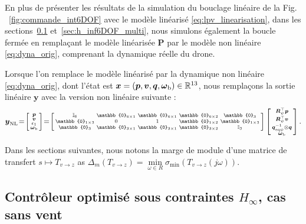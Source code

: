 En plus de présenter les résultats de la simulation du bouclage linéaire de la Fig. ~\ref{fig:commande_int6DOF} avec le modèle linéarisé \eqref{eq:lpv_linearisation}, dans les sections~\ref{sec:zerowind} et~\ref{sec:h_inf6DOF_multi}, nous simulons également la boucle fermée en remplaçant le modèle linéarisée $\boldsymbol{P}$ par le modèle non linéaire \eqref{eq:dyna_orig}, comprenant la dynamique réelle du drone.

Lorsque l'on remplace le modèle linéarisé par la dynamique non linéaire \eqref{eq:dyna_orig}, dont l'état est $\boldsymbol{x} = (\boldsymbol{p}, \boldsymbol{v}, \boldsymbol{q},\boldsymbol{\omega}_{\text{b}}) \in {\mathbb R}^{13} $, nous remplaçons la sortie linéaire $\boldsymbol{y}$ avec la version non linéaire suivante :
\begin{align}
\label{eq:output}
    \boldsymbol{y}_{\text{NL}} \!=\! \smallmat{\boldsymbol{p}\\
     \boldsymbol{v}\\
     \epsilon_{1}\\
     \boldsymbol{\omega}_{\text{b}}} \!=\! \left[ \begin{smallmatrix} \mathbb{I}_{6} & \mathbb{0}_{6\times 1} & \mathbb{0}_{6\times 1} & \mathbb{0}_{6\times 2} & \mathbb{0}_{3}\\
     \mathbb{0}_{1\times 3} & 0 & 1 & \mathbb{0}_{1\times 2} & \mathbb{0}_{1 \times 3} \\
         \mathbb{0}_{3} & \mathbb{0}_{3\times 1} & \mathbb{0}_{3\times 1} & \mathbb{0}_{3\times 2} &   \mathbb{I}_{3}
         \end{smallmatrix} \right]
         \smallmat{\boldsymbol{R}^\top_{\psi}\boldsymbol{p} \\ \boldsymbol{R}^\top_{\psi}\boldsymbol{v} \\
\boldsymbol{q}_{\mathrm{eq}\psi}^{-1} \otimes \boldsymbol{q} \\
         \boldsymbol{\omega}_{\text{b}}  }.
\end{align}


Dans les sections suivantes, nous notons la marge de module d'une matrice de transfert $s \mapsto T_{v \rightarrow z}$ as $\Delta_m(T_{v \rightarrow z}) = \min\limits_{\omega\in R} \sigma_{\min}(T_{v \rightarrow z}(j\omega))$.



\subsection{Contrôleur optimisé sous contraintes $H_{\infty}$, cas sans vent}
\label{sec:zerowind}

